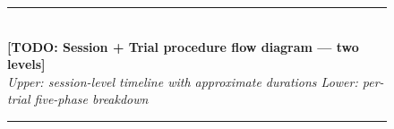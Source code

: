 \documentclass[manuscript,review,anonymous]{acmart}
\begin{document}
\begin{figure}[t]
  \centering
  \noindent\rule{\linewidth}{0.5pt}\\[2.5em]
  {\large\textbf{[TODO: Session + Trial procedure flow diagram — two levels]}}\\[0.8em]
  \textit{Upper: session-level timeline with approximate durations \quad Lower: per-trial five-phase breakdown}\\[2.5em]
  \rule{\linewidth}{0.5pt}

\end{figure}
\end{document}
